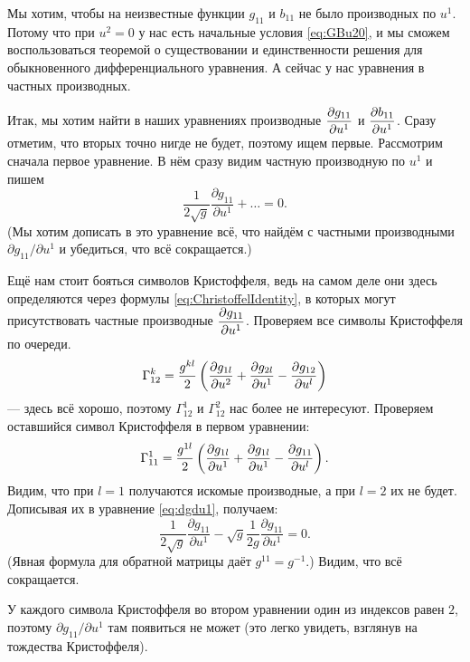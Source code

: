
Мы хотим, чтобы на неизвестные функции $g_{11}$ и $b_{11}$ не было производных по $u^1$. Потому что при $u^2 = 0$ у нас есть начальные условия \eqref{eq:GBu20}, и мы сможем воспользоваться теоремой о существовании и единственности решения для обыкновенного дифференциального уравнения. А сейчас у нас уравнения в частных производных.

Итак, мы хотим найти в наших уравнениях производные $\displaystyle\frac{\partial g_{11}}{\partial u^1}$ и $\displaystyle\frac{\partial b_{11}}{\partial u^1}$. Сразу отметим, что вторых точно нигде не будет, поэтому ищем первые. Рассмотрим сначала первое уравнение. В нём сразу видим частную производную по $u^1$ и пишем
\begin{equation} \label{eq:dgdu1}
	\frac{1}{2\sqrt{g}}\frac{\partial g_{11}}{\partial u^1} + \ldots = 0.
\end{equation}
(Мы хотим дописать в это уравнение всё, что найдём с частными производными $\partial g_{11} / \partial u^1$ и убедиться, что всё сокращается.)

Ещё нам стоит бояться символов Кристоффеля, ведь на самом деле они здесь определяются через формулы \eqref{eq:ChristoffelIdentity}, в которых могут присутствовать частные производные $\displaystyle\frac{\partial g_{11}}{\partial u^1}$. Проверяем все символы Кристоффеля по очереди.
\[
	\Gamma_{12}^k = \frac{g^{kl}}{2}\left(\frac{\partial g_{1l}}{\partial u^2} + \frac{\partial g_{2l}}{\partial u^1} - \frac{\partial g_{12}}{\partial u^l}\right)
\]
--- здесь всё хорошо, поэтому $\Gamma_{12}^1$ и $\Gamma_{12}^2$ нас более не интересуют. Проверяем оставшийся символ Кристоффеля в первом уравнении:
\[
	\Gamma_{11}^1 = \frac{g^{1l}}{2}\left(\frac{\partial g_{1l}}{\partial u^1} + \frac{\partial g_{1l}}{\partial u^1} - \frac{\partial g_{11}}{\partial u^l}\right).
\]
Видим, что при $l = 1$ получаются искомые производные, а при $l = 2$ их не будет. Дописывая их в уравнение \eqref{eq:dgdu1}, получаем:
\[
	\frac{1}{2\sqrt{g}}\frac{\partial g_{11}}{\partial u^1} - \sqrt{g}\frac{1}{2g}\frac{\partial g_{11}}{\partial u^1} = 0.
\]
(Явная формула для обратной матрицы даёт $g^{11} = g^{-1}$.) Видим, что всё сокращается.

У каждого символа Кристоффеля во втором уравнении один из индексов равен $2$, поэтому $\partial g_{11} / \partial u^1$ там появиться не может (это легко увидеть, взглянув на тождества Кристоффеля).

